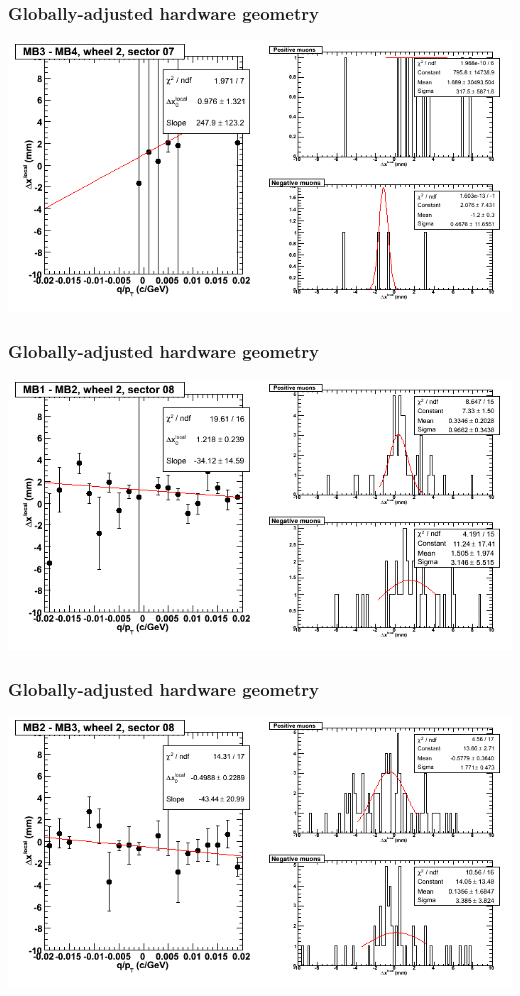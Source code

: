 \documentclass[compress]{beamer}
\begin{document}
\begin{frame}
\frametitle{Globally-adjusted hardware geometry}
\includegraphics[width=\linewidth]{NOV4_segdiffs_HW/dt13_resid_E_07_34.png}
\end{frame}

\begin{frame}
\frametitle{Globally-adjusted hardware geometry}
\includegraphics[width=\linewidth]{NOV4_segdiffs_HW/dt13_resid_E_08_12.png}
\end{frame}

\begin{frame}
\frametitle{Globally-adjusted hardware geometry}
\includegraphics[width=\linewidth]{NOV4_segdiffs_HW/dt13_resid_E_08_23.png}
\end{frame}
\end{document}
